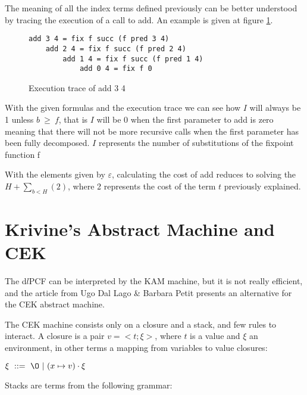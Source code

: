 \documentclass[a4paper,12pt]{article}
\begin{document}
The meaning of all the index terms defined previously can be better
understood by tracing the execution of a call to add. An example is
given at figure \ref{exectrace}. 


\begin{figure}
\label{exectrace}
\begin{center}
\begin{verbatim}
add 3 4 = fix f succ (f pred 3 4)
    add 2 4 = fix f succ (f pred 2 4)
        add 1 4 = fix f succ (f pred 1 4)
            add 0 4 = fix f 0 
\end{verbatim}
\end{center}

\caption{Execution trace of add 3 4}
\end{figure}

With the given formulas and the execution trace we can see how $I$ will always
be 1 unless $b~\geq~f$, that is $I$ will be 0 when the first parameter to add is
zero meaning that there will not be more recursive calls when the first
parameter has been fully decomposed. $I$ represents the number of substitutions of
the fixpoint function f


With the elements given by $\varepsilon$, calculating the cost of add
reduces to solving the $H + \sum\limits_{b<H} (2) $, where 2
represents the cost of the term $t$ previously explained.



\section{Krivine's Abstract Machine and CEK}

The d$l$PCF can be interpreted by the KAM machine, but it is not really
efficient, and the article from Ugo Dal Lago \& Barbara Petit \cite{ldtcbv}
presents an alternative for the CEK abstract machine.

The CEK machine consists only on a closure and a stack, and few rules to
interact. A closure is a pair $v =<t;\xi>$, where $t$ is a value and $\xi$
an environment, in other terms a mapping from variables to value closures:

\begin{center}
  $\xi ~ ::=~\O~|~(x \mapsto v) \cdot \xi$
\end{center}

Stacks are terms from the following grammar:
\end{document}
